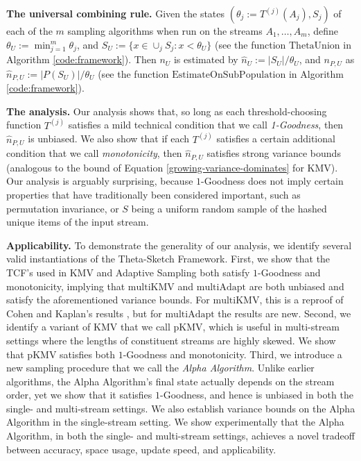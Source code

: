 \documentclass{article}
\newcommand{\romTS}{\hat{n}}
\newcommand{\pIKMV}{\mathrm{pKMV}}
\newcommand{\romKMV}{\mathrm{KMV}}
\newcommand{\romIAdapt}{\mathrm{multiAdapt}}
\newcommand{\romIKMV}{\mathrm{multiKMV}}
\newcommand{\estonsub}{\mathrm{EstimateOnSubPopulation}}
\newcommand{\thetaunion}{\mathrm{ThetaUnion}}
\begin{document}
\medskip
\noindent \textbf{The universal combining rule.} Given the states $(\theta_j:=T^{(j)}(A_j), S_j)$ of each of the $m$ sampling algorithms when run on the streams $A_1, \dots, A_m$,
define $\theta_U := \min_{j=1}^{m} \theta_j$, and $S_U := \{x \in \cup_j S_j \colon x < \theta_U\}$ (see the function $\thetaunion$ in Algorithm \ref{code:framework}). 
Then $n_U$ is estimated by $\romTS_U := |S_U|/\theta_U$, and $n_{P, U}$ as 
$\romTS_{P, U} := 
|P(S_U)| / \theta_U$
(see the function $\estonsub$ in Algorithm \ref{code:framework}).

\medskip
\noindent \textbf{The analysis.} Our analysis shows that, so long as each threshold-choosing function $T^{(j)}$ satisfies a mild technical condition that we 
call \emph{1-Goodness}, then $\romTS_{P, U}$ is unbiased. We also show that if each $T^{(j)}$ satisfies a certain additional condition that we call \emph{monotonicity}, then 
$\romTS_{P, U}$ satisfies strong variance bounds (analogous to the bound of Equation \eqref{growing-variance-dominates} for $\romKMV$).  
Our analysis is arguably surprising, because $1$-Goodness does not imply certain properties that have
traditionally been considered important, such as permutation invariance, or $S$ being a uniform
random sample of the hashed unique items of the input stream.

\medskip
\noindent \textbf{Applicability.}  To demonstrate the generality of our analysis, we identify several valid instantiations of the Theta-Sketch Framework. 
First, we show that the TCF's used in KMV and Adaptive Sampling both satisfy $1$-Goodness and monotonicity, implying that $\romIKMV$ and $\romIAdapt$ are both unbiased and 
satisfy the aforementioned variance bounds. For $\romIKMV$, this is a reproof
of Cohen and Kaplan's results \cite{cohen2009leveraging}, but for $\romIAdapt$ the results are new.
Second, we identify a variant of KMV that we call $\pIKMV$,  which is useful in multi-stream settings where the lengths of constituent streams are highly skewed.
We show that $\pIKMV$ satisfies both $1$-Goodness and monotonicity. Third, we introduce a new sampling procedure that we call the \emph{Alpha Algorithm}. Unlike earlier algorithms, the Alpha Algorithm's
 final state actually depends on the stream order, yet we  
 show that it satisfies $1$-Goodness, and hence
is unbiased in both the single- and multi-stream settings.
We also establish variance bounds on the Alpha Algorithm in the single-stream setting.
We show experimentally that the Alpha Algorithm, in both the single- and multi-stream settings, 
achieves a novel tradeoff between accuracy, space usage, update speed, and applicability. 
\end{document}
